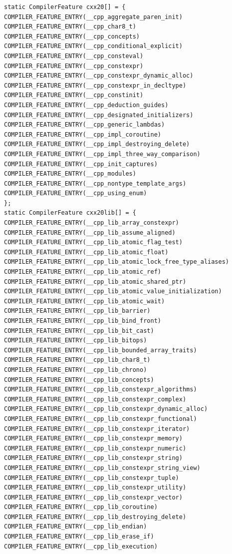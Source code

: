 \begin{lstlisting}[style=styleCXX]
static CompilerFeature cxx20[] = {
COMPILER_FEATURE_ENTRY(__cpp_aggregate_paren_init)
COMPILER_FEATURE_ENTRY(__cpp_char8_t)
COMPILER_FEATURE_ENTRY(__cpp_concepts)
COMPILER_FEATURE_ENTRY(__cpp_conditional_explicit)
COMPILER_FEATURE_ENTRY(__cpp_consteval)
COMPILER_FEATURE_ENTRY(__cpp_constexpr)
COMPILER_FEATURE_ENTRY(__cpp_constexpr_dynamic_alloc)
COMPILER_FEATURE_ENTRY(__cpp_constexpr_in_decltype)
COMPILER_FEATURE_ENTRY(__cpp_constinit)
COMPILER_FEATURE_ENTRY(__cpp_deduction_guides)
COMPILER_FEATURE_ENTRY(__cpp_designated_initializers)
COMPILER_FEATURE_ENTRY(__cpp_generic_lambdas)
COMPILER_FEATURE_ENTRY(__cpp_impl_coroutine)
COMPILER_FEATURE_ENTRY(__cpp_impl_destroying_delete)
COMPILER_FEATURE_ENTRY(__cpp_impl_three_way_comparison)
COMPILER_FEATURE_ENTRY(__cpp_init_captures)
COMPILER_FEATURE_ENTRY(__cpp_modules)
COMPILER_FEATURE_ENTRY(__cpp_nontype_template_args)
COMPILER_FEATURE_ENTRY(__cpp_using_enum)
};
static CompilerFeature cxx20lib[] = {
COMPILER_FEATURE_ENTRY(__cpp_lib_array_constexpr)
COMPILER_FEATURE_ENTRY(__cpp_lib_assume_aligned)
COMPILER_FEATURE_ENTRY(__cpp_lib_atomic_flag_test)
COMPILER_FEATURE_ENTRY(__cpp_lib_atomic_float)
COMPILER_FEATURE_ENTRY(__cpp_lib_atomic_lock_free_type_aliases)
COMPILER_FEATURE_ENTRY(__cpp_lib_atomic_ref)
COMPILER_FEATURE_ENTRY(__cpp_lib_atomic_shared_ptr)
COMPILER_FEATURE_ENTRY(__cpp_lib_atomic_value_initialization)
COMPILER_FEATURE_ENTRY(__cpp_lib_atomic_wait)
COMPILER_FEATURE_ENTRY(__cpp_lib_barrier)
COMPILER_FEATURE_ENTRY(__cpp_lib_bind_front)
COMPILER_FEATURE_ENTRY(__cpp_lib_bit_cast)
COMPILER_FEATURE_ENTRY(__cpp_lib_bitops)
COMPILER_FEATURE_ENTRY(__cpp_lib_bounded_array_traits)
COMPILER_FEATURE_ENTRY(__cpp_lib_char8_t)
COMPILER_FEATURE_ENTRY(__cpp_lib_chrono)
COMPILER_FEATURE_ENTRY(__cpp_lib_concepts)
COMPILER_FEATURE_ENTRY(__cpp_lib_constexpr_algorithms)
COMPILER_FEATURE_ENTRY(__cpp_lib_constexpr_complex)
COMPILER_FEATURE_ENTRY(__cpp_lib_constexpr_dynamic_alloc)
COMPILER_FEATURE_ENTRY(__cpp_lib_constexpr_functional)
COMPILER_FEATURE_ENTRY(__cpp_lib_constexpr_iterator)
COMPILER_FEATURE_ENTRY(__cpp_lib_constexpr_memory)
COMPILER_FEATURE_ENTRY(__cpp_lib_constexpr_numeric)
COMPILER_FEATURE_ENTRY(__cpp_lib_constexpr_string)
COMPILER_FEATURE_ENTRY(__cpp_lib_constexpr_string_view)
COMPILER_FEATURE_ENTRY(__cpp_lib_constexpr_tuple)
COMPILER_FEATURE_ENTRY(__cpp_lib_constexpr_utility)
COMPILER_FEATURE_ENTRY(__cpp_lib_constexpr_vector)
COMPILER_FEATURE_ENTRY(__cpp_lib_coroutine)
COMPILER_FEATURE_ENTRY(__cpp_lib_destroying_delete)
COMPILER_FEATURE_ENTRY(__cpp_lib_endian)
COMPILER_FEATURE_ENTRY(__cpp_lib_erase_if)
COMPILER_FEATURE_ENTRY(__cpp_lib_execution)

\end{lstlisting}
